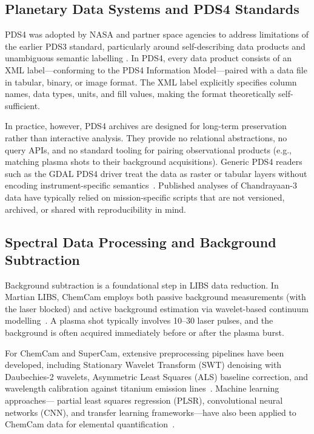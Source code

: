 \documentclass[a4paper,twocolumn,10pt]{article}
\begin{document}
\subsection{Planetary Data Systems and PDS4 Standards}

PDS4 was adopted by NASA and partner space agencies to address
limitations of the earlier PDS3 standard, particularly around
self-describing data products and unambiguous semantic labelling
\cite{Hughes2018}.  In PDS4, every data product consists of an XML
label---conforming to the PDS4 Information Model---paired with a data
file in tabular, binary, or image format.  The XML label explicitly
specifies column names, data types, units, and fill values, making
the format theoretically self-sufficient.

In practice, however, PDS4 archives are designed for long-term
preservation rather than interactive analysis.  They provide no
relational abstractions, no query APIs, and no standard tooling for
pairing observational products (e.g., matching plasma shots to their
background acquisitions).  Generic PDS4 readers such as the GDAL PDS4
driver treat the data as raster or tabular layers without encoding
instrument-specific semantics~\cite{GDALPDS4}.  Published analyses of
Chandrayaan-3 data have typically relied on mission-specific scripts
that are not versioned, archived, or shared with reproducibility in
mind.

\subsection{Spectral Data Processing and Background Subtraction}

Background subtraction is a foundational step in LIBS data reduction.
In Martian LIBS, ChemCam employs both passive background measurements
(with the laser blocked) and active background estimation via
wavelet-based continuum modelling~\cite{Clegg2017}.  A plasma shot
typically involves 10--30 laser pulses, and the background is often
acquired immediately before or after the plasma burst.

For ChemCam and SuperCam, extensive preprocessing pipelines have been
developed, including Stationary Wavelet Transform (SWT) denoising with
Daubechies-2 wavelets, Asymmetric Least Squares (ALS) baseline
correction, and wavelength calibration against titanium emission
lines~\cite{Anderson2022,Clegg2017}.  Machine learning approaches---
partial least squares regression (PLSR), convolutional neural networks
(CNN), and transfer learning frameworks---have also been applied to
ChemCam data for elemental quantification~\cite{Clegg2017,
Castorena2021,Saeidfirozeh2024}.
\end{document}
